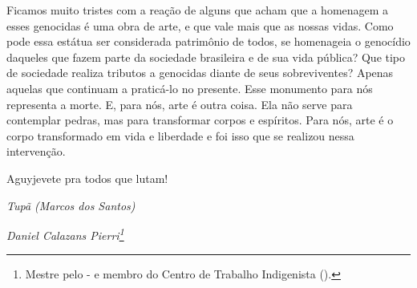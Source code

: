 Ficamos muito tristes com a reação de alguns que acham que a homenagem a
esses genocidas é uma obra de arte, e que vale mais que as nossas
vidas. Como pode essa estátua ser considerada patrimônio de todos, se
homenageia o genocídio daqueles que fazem parte da sociedade brasileira
e de sua vida pública? Que tipo de sociedade realiza tributos a
genocidas diante de seus sobreviventes? Apenas aquelas que continuam a
praticá-lo no presente. Esse monumento para nós representa a morte. E,
para nós, arte é outra coisa. Ela não serve para contemplar pedras,
mas para transformar corpos e espíritos. Para nós, arte é o corpo
transformado em vida e liberdade e foi isso que se realizou nessa
intervenção.

Aguyjevete pra todos que lutam!
\bigskip
\begin{flushright}
\emph{Tupã (Marcos dos Santos)}
\end{flushright}


\begin{flushright}
\emph{Daniel Calazans Pierri\footnote{Mestre pelo - e membro do
Centro de Trabalho Indigenista ().}}
\end{flushright}
\bigskip

